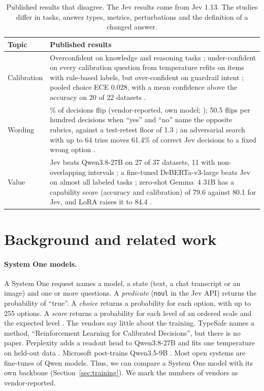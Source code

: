 \documentclass[11pt]{article}
\begin{document}
\begin{table}[t]
\centering
\small
\setlength{\tabcolsep}{3pt}
\begin{tabularx}{\columnwidth}{@{}l>{\raggedright\arraybackslash}X@{}}
\toprule
Topic & Published results \\
\midrule
Calibration & Overconfident on knowledge and reasoning tasks \citep{artificialanalysis2026decision}; under-confident on every calibration question from temperature refits on items with rule-based labels, but over-confident on guardrail intent \citep{sharma2026typedbench}; pooled choice ECE 0.028, with a mean confidence above the accuracy on 20 of 22 datasets \citep{deusser2026evaluating}. \\
\addlinespace
Wording & 1.3\% of decisions flip (vendor-reported, own model; \citealp{microsoft2026decision1}); 50.5 flips per hundred decisions when ``yes'' and ``no'' name the opposite rubrics, against a test-retest floor of 1.3 \citep{rafe2026benchmarking}; an adversarial search with up to 64 tries moves 61.4\% of correct Jev decisions to a fixed wrong option \citep{xu2026jevout}. \\
\addlinespace
Value & Jev beats Qwen3.8-27B on 27 of 37 datasets, 11 with non-overlapping intervals \citep{deusser2026evaluating}; a fine-tuned DeBERTa-v3-large beats Jev on almost all labeled tasks \citep{rafe2026benchmarking}; zero-shot Gemma~4 31B has a capability score (accuracy and calibration) of 79.6 against 80.1 for Jev, and LoRA raises it to 84.4 \citep{geuter2026releasing}. \\
\bottomrule
\end{tabularx}
\caption{Published results that disagree. The Jev results come from Jev 1.13. The studies differ in tasks, answer types, metrics, perturbations and the definition of a changed answer.}
\label{tab:conflicts}
\end{table}

\section{Background and related work}
\label{sec:background}

\paragraph{System One models.}
A System One request names a model, a state (text, a chat transcript or an image) and one or more questions. A \emph{predicate} (\texttt{noul} in the Jev API) returns the probability of ``true''. A \emph{choice} returns a probability for each option, with up to 255 options. A \emph{score} returns a probability for each level of an ordered scale and the expected level \citep{typesafe2026docs}. The vendors say little about the training. TypeSafe names a method, ``Reinforcement Learning for Calibrated Decisions'', but there is no paper. Perplexity adds a readout head to Qwen3.8-27B and fits one temperature on held-out data \citep{perplexity2026decider}. Microsoft post-trains Qwen3.5-9B \citep{microsoft2026decision1}. Most open systems are fine-tunes of Qwen models. Thus, we can compare a System One model with its own backbone (Section~\ref{sec:training}). We mark the numbers of vendors as vendor-reported.
\end{document}
